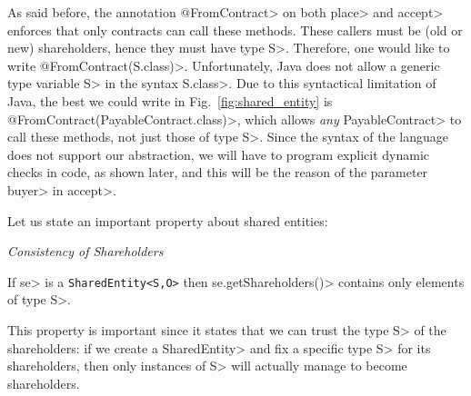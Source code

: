 As said before, the annotation \<@FromContract> on both \<place> and \<accept> enforces that only
contracts can call these methods.
These callers must be (old or new) shareholders,
hence they must have type \<S>. Therefore, one would like to write
\<@FromContract(S.class)>. Unfortunately, Java does not allow a generic type variable \<S>
in the syntax \<S.class>. Due to this syntactical limitation of Java,
the best we could write in Fig.~\ref{fig:shared_entity} is \<@FromContract(PayableContract.class)>,
which allows \emph{any} \<PayableContract> to call these methods, not just those of type \<S>.
Since the syntax of the language does not support our abstraction, we will have to
program explicit dynamic checks in code, as shown later, and this will be the reason of the
parameter \<buyer> in \<accept>.

Let us state an important property about shared entities:
%
\vspace{2ex}
\begin{mdframed}[leftmargin=10pt,rightmargin=10pt]
  \begin{center}\emph{Consistency of Shareholders}\end{center}
  \noindent
  If \<se> is a {\codesize\texttt{SharedEntity<S,O>}}
  then \<se.getShareholders()> contains only elements of type \<S>.
\end{mdframed}
\vspace{2ex}
%
This property is important since it states that we can trust the type \<S> of
the shareholders: if we create a \<SharedEntity> and fix a specific type \<S>
for its shareholders, then only instances of \<S> will actually manage to become shareholders.


